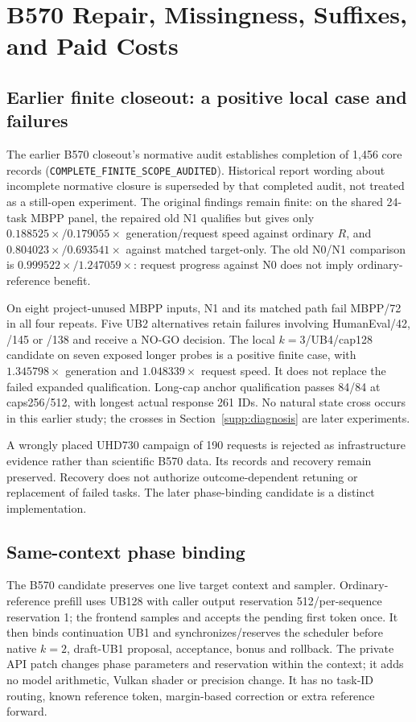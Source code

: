 \section{B570 Repair, Missingness, Suffixes, and Paid Costs}
\label{supp:b570}
\subsection{Earlier finite closeout: a positive local case and failures}
The earlier B570 closeout's normative audit establishes completion of 1,456 core records (\texttt{COMPLETE\_FINITE\_SCOPE\_AUDITED}). Historical report wording about incomplete normative closure is superseded by that completed audit, not treated as a still-open experiment. The original findings remain finite: on the shared 24-task MBPP panel, the repaired old N1 qualifies but gives only $0.188525\times/0.179055\times$ generation/request speed against ordinary $R$, and $0.804023\times/0.693541\times$ against matched target-only. The old N0/N1 comparison is $0.999522\times/1.247059\times$: request progress against N0 does not imply ordinary-reference benefit.

On eight project-unused MBPP inputs, N1 and its matched path fail MBPP/72 in all four repeats. Five UB2 alternatives retain failures involving HumanEval/42, /145 or /138 and receive a NO-GO decision. The local $k=3$/UB4/cap128 candidate on seven exposed longer probes is a positive finite case, with $1.345798\times$ generation and $1.048339\times$ request speed. It does not replace the failed expanded qualification. Long-cap anchor qualification passes 84/84 at caps256/512, with longest actual response 261 IDs. No natural state cross occurs in this earlier study; the crosses in Section~\ref{supp:diagnosis} are later experiments.

A wrongly placed UHD730 campaign of 190 requests is rejected as infrastructure evidence rather than scientific B570 data. Its records and recovery remain preserved. Recovery does not authorize outcome-dependent retuning or replacement of failed tasks. The later phase-binding candidate is a distinct implementation.

\subsection{Same-context phase binding}
The B570 candidate preserves one live target context and sampler. Ordinary-reference prefill uses UB128 with caller output reservation 512/per-sequence reservation 1; the frontend samples and accepts the pending first token once. It then binds continuation UB1 and synchronizes/reserves the scheduler before native $k=2$, draft-UB1 proposal, acceptance, bonus and rollback. The private API patch changes phase parameters and reservation within the context; it adds no model arithmetic, Vulkan shader or precision change. It has no task-ID routing, known reference token, margin-based correction or extra reference forward.

